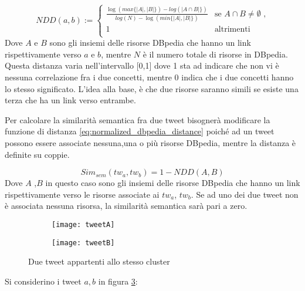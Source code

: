 \begin{equation} \label{eq:normalized_dbpedia_distance}
NDD(a,b):=\begin{cases}
\frac{\log(max\{|A|,|B|\})-log( |A \cap B|\})}{log(N)-\log(min\{|A|,|B|\})} & \text{se $A \cap B \neq \emptyset $  ,}\\
1 & \text{altrimenti}\\
\end{cases}
\end{equation}
Dove $A$ e $B$  sono gli insiemi delle risorse DBpedia che hanno un link rispettivamente verso $a$ e $b$, mentre $N$ è il numero totale di risorse in DBpedia. Questa distanza varia nell'intervallo [0,1] dove 1 sta ad indicare che non vi è nessuna correlazione fra i due concetti, mentre 0 indica che i due concetti hanno lo stesso significato. L'idea alla base, è che due risorse saranno simili se esiste una terza che ha un link verso entrambe.
 
 Per calcolare la similarità semantica fra due tweet bisognerà modificare la
funzione di distanza \ref{eq:normalized_dbpedia_distance}  poiché ad un tweet possono essere associate nessuna,una o più risorse DBpedia, mentre la distanza è definite su coppie.

\begin{equation}
Sim_{sem}(tw_a,tw_b)=1-NDD(A,B)
\end{equation}
Dove $A$ ,$B$ in questo caso sono gli insiemi delle risorse DBpedia che hanno un link rispettivamente verso le risorse associate ai $tw_a$, $tw_b$. Se ad uno dei due tweet non è associata nessuna risorsa, la similarità semantica sarà pari a zero.
 

 
\begin{figure}
    \centering
    \begin{subfigure}[b]{0.45\textwidth}
        \centering
        \texttt{[image: tweetA]}
        \caption{}
        \label{fig:tweeta}
    \end{subfigure}
    \hfill
    \begin{subfigure}[b]{0.45\textwidth}
        \centering
        \texttt{[image: tweetB]}
       \caption{}
        \label{fig:tweetb}
    \end{subfigure}
    \hfill
    
    \caption{Due tweet appartenti allo stesso cluster}
    \label{fig:twotweets}
\end{figure} 
Si considerino i tweet $a,b$ in figura \ref{fig:twotweets}:

